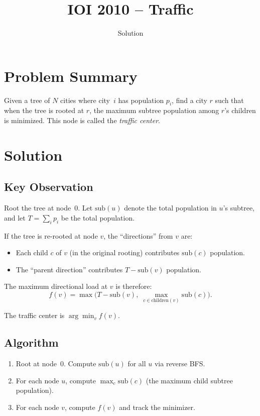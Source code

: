 \documentclass[11pt,a4paper]{article}
\title{IOI 2010 -- Traffic}
\author{Solution}
\date{}
\begin{document}
\maketitle

\section{Problem Summary}
Given a tree of $N$ cities where city~$i$ has population $p_i$, find a city $r$ such that when the tree is rooted at $r$, the maximum subtree population among $r$'s children is minimized. This node is called the \emph{traffic center}.

\section{Solution}

\subsection{Key Observation}
Root the tree at node~$0$. Let $\mathrm{sub}(u)$ denote the total population in $u$'s subtree, and let $T = \sum_i p_i$ be the total population.

If the tree is re-rooted at node $v$, the ``directions'' from $v$ are:
\begin{itemize}
    \item Each child $c$ of $v$ (in the original rooting) contributes $\mathrm{sub}(c)$ population.
    \item The ``parent direction'' contributes $T - \mathrm{sub}(v)$ population.
\end{itemize}

The maximum directional load at $v$ is therefore:
\[
f(v) = \max\!\bigl(T - \mathrm{sub}(v),\; \max_{c \in \mathrm{children}(v)} \mathrm{sub}(c)\bigr).
\]

The traffic center is $\arg\min_v f(v)$.

\subsection{Algorithm}
\begin{enumerate}
    \item Root at node~$0$. Compute $\mathrm{sub}(u)$ for all $u$ via reverse BFS.
    \item For each node $u$, compute $\max_{c} \mathrm{sub}(c)$ (the maximum child subtree population).
    \item For each node $v$, compute $f(v)$ and track the minimizer.
\end{enumerate}
\end{document}
